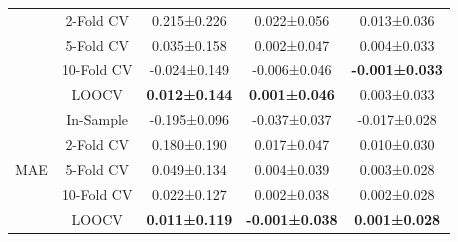 \begin{table}[H]
\begin{tabular}{lcccc}
                & 2-Fold CV
                    & 0.215±0.226
                    & 0.022±0.056
                    & 0.013±0.036 \\
                & 5-Fold CV
                    & 0.035±0.158
                    & 0.002±0.047
                    & 0.004±0.033 \\
                & 10-Fold CV
                    & -0.024±0.149
                    & -0.006±0.046
                    & \textbf{-0.001±0.033} \\
                & LOOCV
                    & \textbf{0.012±0.144}
                    & \textbf{0.001±0.046}
                    & 0.003±0.033 \\
        \midrule
        \multirow{5}{*}{MAE}
                & In-Sample
                    & -0.195±0.096
                    & -0.037±0.037
                    & -0.017±0.028 \\
                & 2-Fold CV
                    & 0.180±0.190
                    & 0.017±0.047
                    & 0.010±0.030 \\
                & 5-Fold CV
                    & 0.049±0.134
                    & 0.004±0.039
                    & 0.003±0.028 \\
                & 10-Fold CV
                    & 0.022±0.127
                    & 0.002±0.038
                    & 0.002±0.028 \\
                & LOOCV
                    & \textbf{0.011±0.119}
                    & \textbf{-0.001±0.038}
                    & \textbf{0.001±0.028} \\
        \bottomrule
    \end{tabular}
    \label{tab:eval_bias}
\end{table}
    

